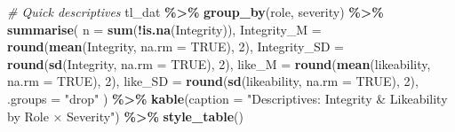 \documentclass[
]{article}
\newenvironment{Shaded}{\begin{snugshade}}{\end{snugshade}}
\newcommand{\AttributeTok}[1]{\textcolor[rgb]{0.13,0.29,0.53}{#1}}
\newcommand{\CommentTok}[1]{\textcolor[rgb]{0.56,0.35,0.01}{\textit{#1}}}
\newcommand{\ConstantTok}[1]{\textcolor[rgb]{0.56,0.35,0.01}{#1}}
\newcommand{\DecValTok}[1]{\textcolor[rgb]{0.00,0.00,0.81}{#1}}
\newcommand{\FunctionTok}[1]{\textcolor[rgb]{0.13,0.29,0.53}{\textbf{#1}}}
\newcommand{\NormalTok}[1]{#1}
\newcommand{\SpecialCharTok}[1]{\textcolor[rgb]{0.81,0.36,0.00}{\textbf{#1}}}
\newcommand{\StringTok}[1]{\textcolor[rgb]{0.31,0.60,0.02}{#1}}
\begin{document}
\begin{Shaded}
\begin{Highlighting}[]
\CommentTok{\# Quick descriptives}
\NormalTok{tl\_dat }\SpecialCharTok{\%\textgreater{}\%}
  \FunctionTok{group\_by}\NormalTok{(role, severity) }\SpecialCharTok{\%\textgreater{}\%}
  \FunctionTok{summarise}\NormalTok{(}
    \AttributeTok{n          =} \FunctionTok{sum}\NormalTok{(}\SpecialCharTok{!}\FunctionTok{is.na}\NormalTok{(Integrity)),}
    \AttributeTok{Integrity\_M    =} \FunctionTok{round}\NormalTok{(}\FunctionTok{mean}\NormalTok{(Integrity, }\AttributeTok{na.rm =} \ConstantTok{TRUE}\NormalTok{), }\DecValTok{2}\NormalTok{),}
    \AttributeTok{Integrity\_SD   =} \FunctionTok{round}\NormalTok{(}\FunctionTok{sd}\NormalTok{(Integrity,   }\AttributeTok{na.rm =} \ConstantTok{TRUE}\NormalTok{), }\DecValTok{2}\NormalTok{),}
    \AttributeTok{like\_M     =} \FunctionTok{round}\NormalTok{(}\FunctionTok{mean}\NormalTok{(likeability, }\AttributeTok{na.rm =} \ConstantTok{TRUE}\NormalTok{), }\DecValTok{2}\NormalTok{),}
    \AttributeTok{like\_SD    =} \FunctionTok{round}\NormalTok{(}\FunctionTok{sd}\NormalTok{(likeability,   }\AttributeTok{na.rm =} \ConstantTok{TRUE}\NormalTok{), }\DecValTok{2}\NormalTok{),}
    \AttributeTok{.groups =} \StringTok{"drop"}
\NormalTok{  ) }\SpecialCharTok{\%\textgreater{}\%}
  \FunctionTok{kable}\NormalTok{(}\AttributeTok{caption =} \StringTok{"Descriptives: Integrity \& Likeability by Role × Severity"}\NormalTok{) }\SpecialCharTok{\%\textgreater{}\%}
  \FunctionTok{style\_table}\NormalTok{()}
\end{Highlighting}
\end{Shaded}
\end{document}
